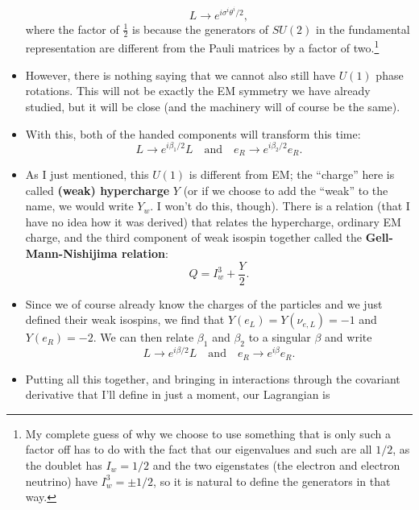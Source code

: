 \begin{itemize}
\begin{equation}
            L \rightarrow e^{i \sigma^i\theta^i/2},
        \end{equation}
        where the factor of $\frac{1}{2}$ is because the generators of $SU(2)$ in the fundamental representation are different from the Pauli matrices by a factor of two.\footnote{My complete guess of why we choose to use something that is only such a factor off has to do with the fact that our eigenvalues and such are all $1/2$, as the doublet has $I_w=1/2$ and the two eigenstates (the electron and electron neutrino) have $I_w^3=\pm1/2$, so it is natural to define the generators in that way.}
    \item However, there is nothing saying that we cannot also still have $U(1)$ phase rotations. This will not be exactly the EM symmetry we have already studied, but it will be close (and the machinery will of course be the same).
    \item With this, both of the handed components will transform this time:
        \begin{equation}
            L \rightarrow e^{i\beta_1/2}L \quad\mathrm{and}\quad e_R \rightarrow e^{i\beta_2/2}e_R.
        \end{equation}
    \item As I just mentioned, this $U(1)$ is different from EM; the ``charge'' here is called \textbf{(weak) hypercharge} $Y$ (or if we choose to add the ``weak'' to the name, we would write $Y_w$. I won't do this, though). There is a relation (that I have no idea how it was derived) that relates the hypercharge, ordinary EM charge, and the third component of weak isospin together called the \textbf{Gell-Mann-Nishijima relation}:
        \begin{equation}
            Q = I_w^3 + \frac{Y}{2}.
        \end{equation}
    \item Since we of course already know the charges of the particles and we just defined their weak isospins, we find that $Y(e_L) = Y(\nu_{e,L}) = -1$ and $Y(e_R)=-2$. We can then relate $\beta_1$ and $\beta_2$ to a singular $\beta$ and write
        \begin{equation}
            L \rightarrow e^{i\beta/2}L \quad\mathrm{and}\quad e_R \rightarrow e^{i\beta}e_R.
        \end{equation}
    \item Putting all this together, and bringing in interactions through the covariant derivative that I'll define in just a moment, our Lagrangian is
        \begin{equation}

\end{equation}
\end{itemize}

